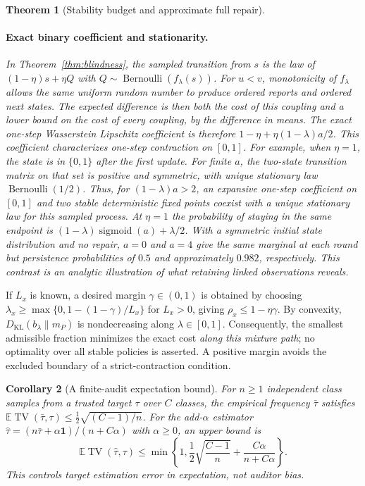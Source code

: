 \documentclass[10pt]{article}
\newtheorem{theorem}{Theorem}
\newtheorem{corollary}[theorem]{Corollary}
\newcommand{\E}{\mathbb E}
\newcommand{\KL}{D_{\mathrm{KL}}}
\newcommand{\TV}{\operatorname{TV}}
\newcommand{\sig}{\operatorname{sigmoid}}
\begin{document}
\begin{theorem}[Stability budget and approximate full repair]
\paragraph{Exact binary coefficient and stationarity.}
In Theorem~\ref{thm:blindness}, the sampled transition from $s$ is the
law of $(1-\eta)s+\eta Q$ with $Q\sim\operatorname{Bernoulli}(f_\lambda(s))$.
For $u<v$, monotonicity of $f_\lambda$ allows the same uniform random
number to produce ordered reports and ordered next states. The expected
difference is then both the cost of this coupling and a lower bound on
the cost of every coupling, by the difference in means. The exact
one-step Wasserstein Lipschitz coefficient is therefore
$1-\eta+\eta(1-\lambda)a/2$.
This coefficient characterizes one-step contraction on $[0,1]$. For
example, when $\eta=1$, the state is in $\{0,1\}$ after the first
update. For finite $a$, the two-state transition matrix on that set
is positive and symmetric, with unique stationary law
$\operatorname{Bernoulli}(1/2)$. Thus, for $(1-\lambda)a>2$, an
expansive one-step coefficient on $[0,1]$ and two stable deterministic
fixed points coexist with a unique stationary law for this sampled process.
At $\eta=1$ the probability of staying in the same endpoint is
$(1-\lambda)\sig(a)+\lambda/2$. With a symmetric initial state
distribution and no repair, $a=0$ and $a=4$ give the same marginal
at each round but persistence probabilities of $0.5$ and approximately
$0.982$, respectively. This contrast is an analytic illustration of
what retaining linked observations reveals.
\end{theorem}

If $L_x$ is known, a desired margin $\gamma\in(0,1)$ is obtained by choosing
$\lambda_x\ge\max\{0,1-(1-\gamma)/L_x\}$ for $L_x>0$, giving
$\rho_x\le1-\eta\gamma$. By convexity, $\KL(b_\lambda\|m_P)$ is
nondecreasing along $\lambda\in[0,1]$. Consequently, the smallest admissible
fraction minimizes the exact cost \emph{along this mixture path}; no
optimality over all stable policies is asserted. A positive margin avoids
the excluded boundary of a strict-contraction condition.

\begin{corollary}[A finite-audit expectation bound]
\label{cor:audit}
For $n\ge1$ independent class samples from a trusted target $\tau$ over $C$ classes,
the empirical frequency $\bar\tau$ satisfies
$\E\TV(\bar\tau,\tau)\le\tfrac12\sqrt{(C-1)/n}$.
For the add-$\alpha$ estimator
$\widehat\tau=(n\bar\tau+\alpha\boldsymbol1)/(n+C\alpha)$ with $\alpha\ge0$,
an upper bound is
\begin{equation}
 \E\TV(\widehat\tau,\tau)
 \le\min\left\{1,\frac12\sqrt{\frac{C-1}{n}}+
                   \frac{C\alpha}{n+C\alpha}\right\}.
 \label{eq:auditsamples}
\end{equation}
This controls target estimation error in expectation, not auditor bias.
\end{corollary}
\end{document}
